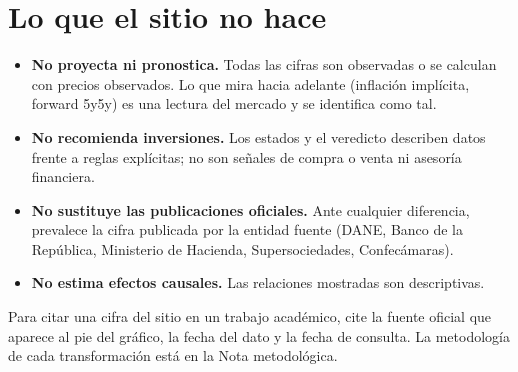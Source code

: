 \chapter{Lo que el sitio no hace}
\label{es:i:limites}

\begin{itemize}
\item \textbf{No proyecta ni pronostica.} Todas las cifras son observadas o se calculan con precios observados. Lo que
  mira hacia adelante (inflación implícita, forward 5y5y) es una lectura del mercado y se identifica como tal.
\item \textbf{No recomienda inversiones.} Los estados y el veredicto describen datos frente a reglas explícitas; no son
  señales de compra o venta ni asesoría financiera.
\item \textbf{No sustituye las publicaciones oficiales.} Ante cualquier diferencia, prevalece la cifra publicada por
  la entidad fuente (DANE, Banco de la República, Ministerio de Hacienda, Supersociedades, Confecámaras).
\item \textbf{No estima efectos causales.} Las relaciones mostradas son descriptivas.
\end{itemize}

\begin{dato}
Para citar una cifra del sitio en un trabajo académico, cite la fuente oficial que aparece al pie del gráfico, la fecha
del dato y la fecha de consulta. La metodología de cada transformación está en la Nota metodológica.
\end{dato}

